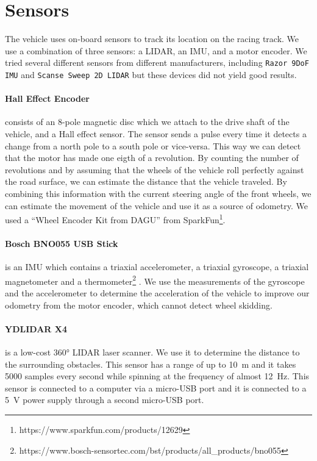 \section{Sensors}

The vehicle uses on-board sensors to track its location on the racing track. We use a combination of three sensors: a \gls{LIDAR}, an \gls{IMU}, and a motor encoder. We tried several different sensors from different manufacturers, including \verb|Razor 9DoF IMU| and \verb|Scanse Sweep 2D LIDAR| but these devices did not yield good results. 

\paragraph{Hall Effect Encoder} consists of an 8-pole magnetic disc which we attach to the drive shaft of the vehicle, and a Hall effect sensor. The sensor sends a pulse every time it detects a change from a north pole to a south pole or vice-versa. This way we can detect that the motor has made one eigth of a revolution. By counting the number of revolutions and by assuming that the wheels of the vehicle roll perfectly against the road surface, we can estimate the distance that the vehicle traveled. By combining this information with the current steering angle of the front wheels, we can estimate the movement of the vehicle and use it as a source of odometry. We used a ``Wheel Encoder Kit from DAGU'' from SparkFun\footnote{https://www.sparkfun.com/products/12629}.

\paragraph{Bosch BNO055 USB Stick} is an \gls{IMU} which contains a triaxial accelerometer, a triaxial gyroscope, a triaxial magnetometer and a thermometer\footnote{https://www.bosch-sensortec.com/bst/products/all\_products/bno055} . We use the measurements of the gyroscope and the accelerometer to determine the acceleration of the vehicle to improve our odometry from the motor encoder, which cannot detect wheel skidding.

\paragraph{YDLIDAR X4} is a low-cost \ang{360} \gls{LIDAR} laser scanner. We use it to determine the distance to the surrounding obstacles. This sensor has a range of up to \SI{10}{\meter} and it takes \num{5000} samples every second while spinning at the frequency of almost \SI{12}{\hertz}. This sensor is connected to a computer via a micro-USB port and it is connected to a \SI{5}{\volt} power supply through a second micro-USB port.

